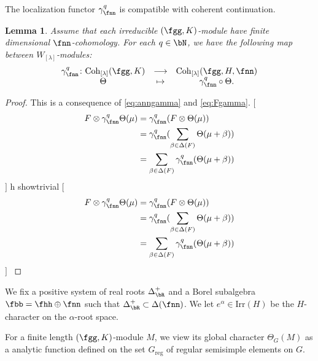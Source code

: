 \documentclass[12pt,a4paper]{amsart}
\newcommand{\trivial}[2][]{\if\relax\detokenize{#1}\relax
  {%
      \color{orange} \vspace{0em} $[$  #2 $]$
      \color{black}
  }
  \else
\ifx#1h
\ifcsname showtrivial\endcsname
{%
    \color{orange} \vspace{0em}  $[$ #2 $]$
    \color{black}
}
\fi
\else {\red Wrong argument!} \fi
\fi
}
\numberwithin{equation}{section}
\newtheorem{lem}[thm]{Lemma}
\theoremstyle{remark}
\def\Irr{\mathrm{Irr}}
\def\WT#1{\Delta(#1)}
\def\Wlam{W_{[\lambda]}}
\def\Coh{\mathrm{Coh}}
\def\Greg{G_{\text{reg}}}
\begin{document}
The localization functor $\gamma_{\fnn}^{q}$ is compatible with coherent
continuation.
\begin{lem}\label{lem:coh.gamma}
  Assume that each irreducible $(\fgg,K)$-module have finite dimensional
  $\fnn$-cohomology. For each $q\in \bN$, we have the following map between
  $\Wlam$-modules:
  \[
    \begin{array}{ccc}
      \gamma_{\fnn}^{q}\colon \Coh_{[\lambda]}(\fgg,K)
      &\longrightarrow
      & \Coh_{[\lambda]}(\fgg,H,\fnn) \\
      \Theta & \mapsto & \gamma_{\fnn}^{q}\circ \Theta.
    \end{array}
  \]
\end{lem}
\begin{proof}
  This is a consequence of \eqref{eq:anngamma} and \eqref{eq:Fgamma}. \trivial[]{
    \[
      \begin{split}
        F\otimes \gamma_{\fnn}^q\Theta(\mu) & =
        \gamma_{\fnn}^{q}(F\otimes \Theta(\mu))\\
        &= \gamma_{\fnn}^{q}(\sum_{\beta\in \WT{F}} \Theta(\mu+\beta))\\
        &= \sum_{\beta\in \WT{F}}\gamma_{\fnn}^{q}( \Theta(\mu+\beta))\\
      \end{split}
    \]
  }
\end{proof}

We fix a positive system of real roots $\Delta^{+}_{\bR}$ and a Borel subalgebra
$\fbb=\fhh\oplus \fnn$ such that $\Delta^{+}_{\bR}\subset \WT{\fnn}$. We let
$e^{\alpha}\in \Irr(H)$ be the $H$-character on the $\alpha$-root space.

For a finite length $(\fgg,K)$-module $M$, we view its global character
$\Theta_{G}(M)$ as a analytic function defined on the set $\Greg$ of regular
semisimple elements on $G$.
\end{document}
